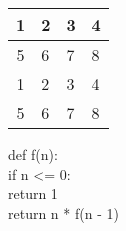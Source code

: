 \documentclass[11pt]{article}
\begin{document}
    \begin{center}\begin{tabular}{|c||l|l|l|}
        \hline 
        1 & 2 & 3 & 4 \\ \hline 
        5 & 6 & 7 & 8 \\ \hline 
        1 & 2 & 3 & 4 \\ \hline 
        5 & 6 & 7 & 8 \\ \hline 
    \end{tabular}
    \end{center}
    
    {\ttfamily 
        def f(n): \\
            if n <= 0: \\
                return 1 \\
            
            return n * f(n - 1) \\}
\end{document}
